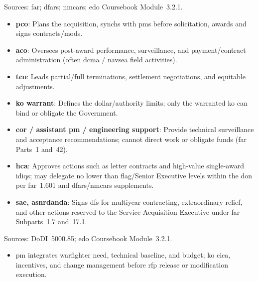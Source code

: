 \documentclass[../main.tex]{subfiles}
\begin{document}
\begin{description}[style=nextline, labelsep=0.5em, font=\bfseries]
  \item[\textbf{Contracting authority (\ac{ko} family).}]
        Sources: \ac{far}; \ac{dfars}; \ac{nmcars}; \ac{edo} Coursebook Module~3.2.1.
        \begin{itemize}
          \item \textbf{\ac{pco}}: Plans the acquisition, synchs with \acp{pm} before solicitation, awards and signs contracts/mods.
          \item \textbf{\ac{aco}}: Oversees post-award performance, surveillance, and payment/contract administration (often \ac{dcma} / \ac{navsea} field activities).
          \item \textbf{\ac{tco}}: Leads partial/full terminations, settlement negotiations, and equitable adjustments.
          \item \textbf{\ac{ko} warrant}: Defines the dollar/authority limits; only the warranted \ac{ko} can bind or obligate the Government.
          \item \textbf{\ac{cor} / assistant \ac{pm} / engineering support}: Provide technical surveillance and acceptance recommendations; cannot direct work or obligate funds (\ac{far} Parts~1 and~42).
          \item \textbf{\ac{hca}}: Approves actions such as letter contracts and high-value single-award \acp{idiq}; may delegate no lower than flag/Senior Executive levels within the \ac{don} per \ac{far}~1.601 and \ac{dfars}/\ac{nmcars} supplements.
          \item \textbf{\ac{sae}, \ac{asnrdanda}}: Signs \acp{df} for multiyear contracting, extraordinary relief, and other actions reserved to the Service Acquisition Executive under \ac{far} Subparts~1.7 and~17.1.
        \end{itemize}

  \item[\textbf{Program Manager / \ac{ko} partnership.}]
        Sources: DoDI~5000.85; \ac{edo} Coursebook Module~3.2.1.
        \begin{itemize}
          \item \ac{pm} integrates warfighter need, technical baseline, and budget; \ac{ko} \ac{cica}, incentives, and change management before \ac{rfp} release or modification execution.
        \end{itemize}


\end{description}
\end{document}

